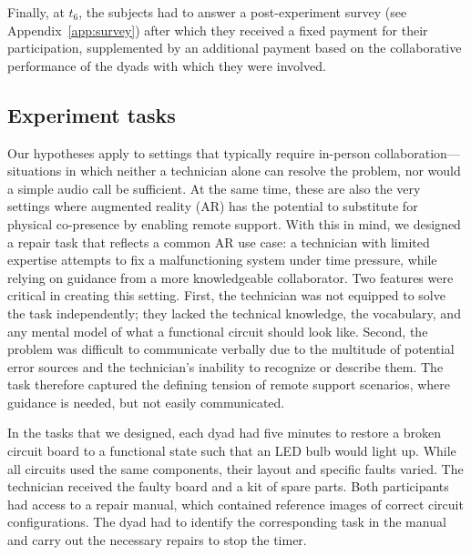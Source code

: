\documentclass[msom,nonblindrev]{01 latex/class/informs3}
\begin{document}

Finally, at $t_6$, the subjects had to answer a post-experiment survey (see Appendix~\ref{app:survey}) after which they received a fixed payment for their participation, supplemented by an additional payment based on the collaborative performance of the dyads with which they were involved.

\subsection{Experiment tasks\label{subsec:experiment_tasks}}
Our hypotheses apply to settings that typically require in-person collaboration—situations in which neither a technician alone can resolve the problem, nor would a simple audio call be sufficient. At the same time, these are also the very settings where augmented reality (AR) has the potential to substitute for physical co-presence by enabling remote support. With this in mind, we designed a repair task that reflects a common AR use case: a technician with limited expertise attempts to fix a malfunctioning system under time pressure, while relying on guidance from a more knowledgeable collaborator. Two features were critical in creating this setting. First, the technician was not equipped to solve the task independently; they lacked the technical knowledge, the vocabulary, and any mental model of what a functional circuit should look like. Second, the problem was difficult to communicate verbally due to the multitude of potential error sources and the technician’s inability to recognize or describe them. The task therefore captured the defining tension of remote support scenarios, where guidance is needed, but not easily communicated.

In the tasks that we designed, each dyad had five minutes to restore a broken circuit board to a functional state such that an LED bulb would light up. While all circuits used the same components, their layout and specific faults varied. The technician received the faulty board and a kit of spare parts. Both participants had access to a repair manual, which contained reference images of correct circuit configurations. The dyad had to identify the corresponding task in the manual and carry out the necessary repairs to stop the timer.
\end{document}
